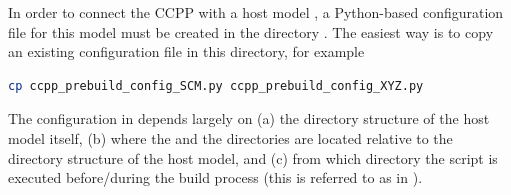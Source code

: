 In order to connect the CCPP with a host model , a Python-based configuration file for this model must be created in the directory . The easiest way is to copy an existing configuration file in this directory, for example
\begin{lstlisting}[language=bash]
cp ccpp_prebuild_config_SCM.py ccpp_prebuild_config_XYZ.py
\end{lstlisting}
The configuration in  depends largely on (a) the directory structure of the host model itself, (b) where the  and the  directories are located relative to the directory structure of the host model, and (c) from which directory the  script is executed before/during the build process (this is referred to as  in ).

